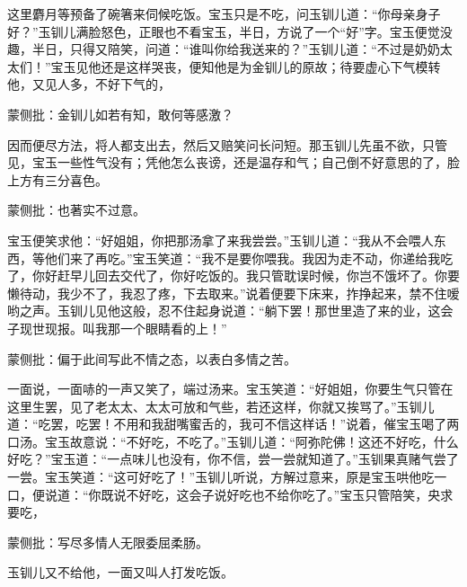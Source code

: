 \begin{parag}
    这里麝月等预备了碗箸来伺候吃饭。宝玉只是不吃，问玉钏儿道：“你母亲身子好？”玉钏儿满脸怒色，正眼也不看宝玉，半日，方说了一个“好”字。宝玉便觉没趣，半日，只得又陪笑，问道：“谁叫你给我送来的？”玉钏儿道：“不过是奶奶太太们！”宝玉见他还是这样哭丧，便知他是为金钏儿的原故；待要虚心下气模转他，又见人多，不好下气的，\begin{note}蒙侧批：金钏儿如若有知，敢何等感激？\end{note}因而便尽方法，将人都支出去，然后又赔笑问长问短。那玉钏儿先虽不欲，只管见，宝玉一些性气没有；凭他怎么丧谤，还是温存和气；自己倒不好意思的了，脸上方有三分喜色。\begin{note}蒙侧批：也著实不过意。\end{note}宝玉便笑求他：“好姐姐，你把那汤拿了来我尝尝。”玉钏儿道：“我从不会喂人东西，等他们来了再吃。”宝玉笑道：“我不是要你喂我。我因为走不动，你递给我吃了，你好赶早儿回去交代了，你好吃饭的。我只管耽误时候，你岂不饿坏了。你要懒待动，我少不了，我忍了疼，下去取来。”说着便要下床来，拃挣起来，禁不住嗳哟之声。玉钏儿见他这般，忍不住起身说道：“躺下罢！那世里造了来的业，这会子现世现报。叫我那一个眼睛看的上！”\begin{note}蒙侧批：偏于此间写此不情之态，以表白多情之苦。\end{note}一面说，一面哧的一声又笑了，端过汤来。宝玉笑道：“好姐姐，你要生气只管在这里生罢，见了老太太、太太可放和气些，若还这样，你就又挨骂了。”玉钏儿道：“吃罢，吃罢！不用和我甜嘴蜜舌的，我可不信这样话！”说着，催宝玉喝了两口汤。宝玉故意说：“不好吃，不吃了。”玉钏儿道：“阿弥陀佛！这还不好吃，什么好吃？”宝玉道：“一点味儿也没有，你不信，尝一尝就知道了。”玉钏果真赌气尝了一尝。宝玉笑道：“这可好吃了！”玉钏儿听说，方解过意来，原是宝玉哄他吃一口，便说道：“你既说不好吃，这会子说好吃也不给你吃了。”宝玉只管陪笑，央求要吃，\begin{note}蒙侧批：写尽多情人无限委屈柔肠。\end{note}玉钏儿又不给他，一面又叫人打发吃饭。
\end{parag}


